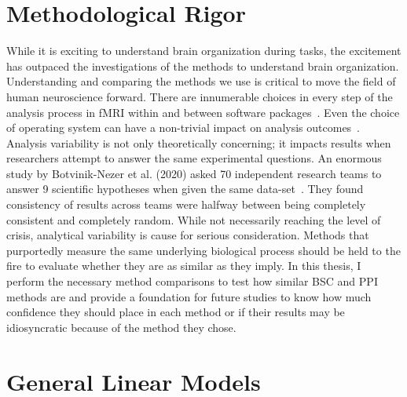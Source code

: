 \documentclass[phd,figures,tables,ackpage,abstractpage,publicabstractpage]{uithesis}
\begin{document}
\section{Methodological Rigor}

While it is exciting to understand brain organization during tasks,
the excitement has outpaced the investigations of the methods to understand brain organization.
Understanding and comparing the methods we use is critical to move the field of
human neuroscience forward.
There are innumerable choices in every step of the analysis process in
fMRI within and between software packages~\cite{Bowring2019,Carp2012}.
Even the choice of operating system can have a non-trivial impact on
analysis outcomes~\cite{Glatard2015}.
Analysis variability is not only theoretically concerning; it impacts
results when researchers attempt to answer the same experimental questions.
An enormous study by Botvinik-Nezer et al. (2020) asked 70 independent research teams
to answer 9 scientific hypotheses when given the same data-set~\cite{Botvinik-Nezer2020}.
They found consistency of results across teams were halfway between
being completely consistent and completely random.
While not necessarily reaching the level of crisis,
analytical variability is cause for serious consideration.
Methods that purportedly measure the same underlying biological process
should be held to the fire to evaluate whether they are as similar
as they imply.
In this thesis, I perform the necessary method comparisons
to test how similar BSC and PPI methods are and provide a foundation
for future studies to know how much confidence they should
place in each method or if their results may be idiosyncratic
because of the method they chose.

\section{General Linear Models}
\end{document}
